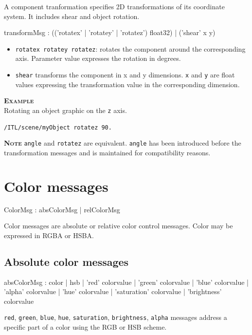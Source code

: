 \documentclass[a4paper,twoside]{report}
\newcommand{\sublevel}[1]	{\section{#1}}
\newcommand{\subsublevel}[1]	{\subsection{#1}}
\newcommand{\OSC}[1]		{\texttt{#1}}
\newcommand{\example}		{\textbf{\hspace{-1.5cm}\textbf{\textsc{Example }}}}
\newcommand{\note}	[1]		{\vspace{2mm}\textbf{\hspace{-1.03cm}\textbf{\textsc{Note #1}}}}
\newcommand{\sample}	[1]			{\vspace{-2mm}\begin{center}\colorbox{mygrey}{
								\begin{minipage}[t]{0.9\columnwidth} 
								{\small \texttt{#1}}
								\end{minipage}}\end{center}}
\begin{document}
A component tranformation specifies 2D transformations of its coordinate system. It includes shear and object rotation.

\begin{rail}
transformMsg :
			(('rotatex' | 'rotatey' | 'rotatez') float32)
		| 	('shear' x y)
\end{rail}

\begin{itemize}
\item \OSC{rotatex rotatey rotatez}: rotates the component around the corresponding axis. Parameter value expresses the rotation in degrees.
\item \OSC{shear} transforms the component in x and y dimensions. \OSC{x} and \OSC{y} are float values expressing the transformation value in the corresponding dimension.
\end{itemize}

\example \\
Rotating an object graphic on the \OSC{z} axis.
\sample{/ITL/scene/myObject rotatez 90.}

\note{} \OSC{angle} and \OSC{rotatez} are equivalent. \OSC{angle} has been introduced before the transformation messages and is maintained for compatibility reasons.

\sublevel{Color messages}
\label{colormsg}


\begin{rail}
ColorMsg : 	absColorMsg 
			|	relColorMsg 
\end{rail}

Color messages are absolute or relative color control messages. Color may be expressed in RGBA or HSBA.

\subsublevel{Absolute color messages}

\begin{rail}
absColorMsg :    color
			| hsb
			| 'red' colorvalue
			| 'green' colorvalue
			| 'blue' colorvalue
			| 'alpha' colorvalue
			| 'hue' colorvalue
			| 'saturation' colorvalue
			| 'brightness' colorvalue
\end{rail}


\OSC{red}, \OSC{green}, \OSC{blue}, \OSC{hue}, \OSC{saturation}, \OSC{brightness}, \OSC{alpha} messages address a specific part of a color using the RGB or HSB scheme.
\end{document}
